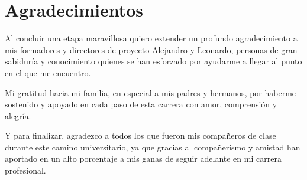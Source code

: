 \chapter*{Agradecimientos}

Al concluir una etapa maravillosa quiero extender un profundo agradecimiento a mis 
formadores y directores de proyecto Alejandro y Leonardo, personas de gran sabiduría 
y conocimiento quienes se han esforzado por ayudarme a llegar al punto en el que me 
encuentro.

Mi gratitud hacia mi familia, en especial a mis padres y hermanos, por haberme 
sostenido y apoyado en cada paso de esta carrera con amor, comprensión y alegría.

Y para finalizar, agradezco a todos los que fueron mis compañeros de clase durante 
este camino universitario, ya que gracias al compañerismo y amistad han aportado en 
un alto porcentaje a mis ganas de seguir adelante en mi carrera profesional.
